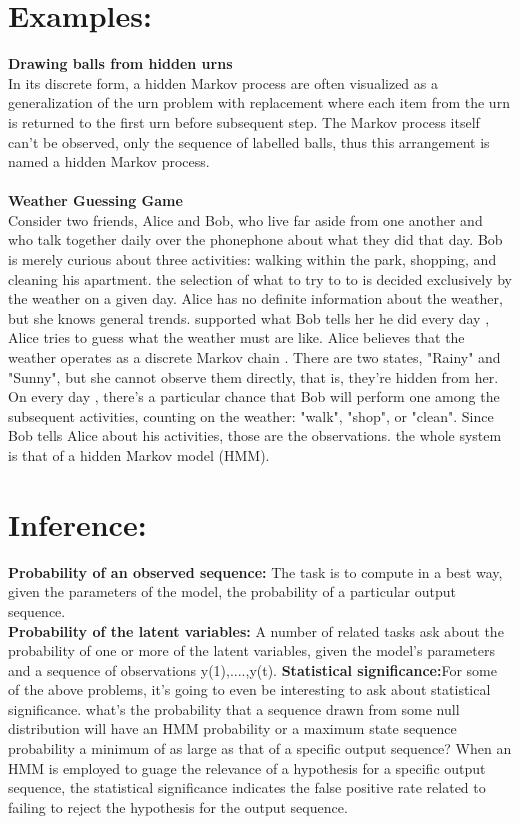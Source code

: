 \documentclass[10pt,a4paper,twoside]{article}
\begin{document}
\section{Examples:}
{\bf Drawing balls from hidden urns}\\
In its discrete form, a hidden Markov process are often visualized as a generalization of the urn problem with replacement where each item from the urn is returned to the first urn before subsequent step. The Markov process itself can't be observed, only the sequence of labelled balls, thus this arrangement is named a hidden Markov process. \\
\\
{\bf Weather Guessing Game}\\
Consider two friends, Alice and Bob, who live far aside from one another and who talk together daily over the phonephone about what they did that day. Bob is merely curious about three activities: walking within the park, shopping, and cleaning his apartment. the selection of what to try to to is decided exclusively by the weather on a given day. Alice has no definite information about the weather, but she knows general trends. supported what Bob tells her he did every day , Alice tries to guess what the weather must are like.
Alice believes that the weather operates as a discrete Markov chain . There are two states, "Rainy" and "Sunny", but she cannot observe them directly, that is, they're hidden from her. On every day , there's a particular chance that Bob will perform one among the subsequent activities, counting on the weather: "walk", "shop", or "clean". Since Bob tells Alice about his activities, those are the observations. the whole system is that of a hidden Markov model (HMM).\\

\section{Inference:}
{\bf Probability of an observed sequence:}
The task is to compute in a best way, given the parameters of the model, the probability of a particular output sequence. \\
{\bf Probability of the latent variables:}
A number of related tasks ask about the probability of one or more of the latent variables, given the model's parameters and a sequence of observations y(1),....,y(t).
{\bf Statistical significance:}For some of the above problems, it's going to even be interesting to ask about statistical significance. what's the probability that a sequence drawn from some null distribution will have an HMM probability or a maximum state sequence probability a minimum of as large as that of a specific output sequence? When an HMM is employed to guage the relevance of a hypothesis for a specific output sequence, the statistical significance indicates the false positive rate related to failing to reject the hypothesis for the output sequence.
\end{document}
